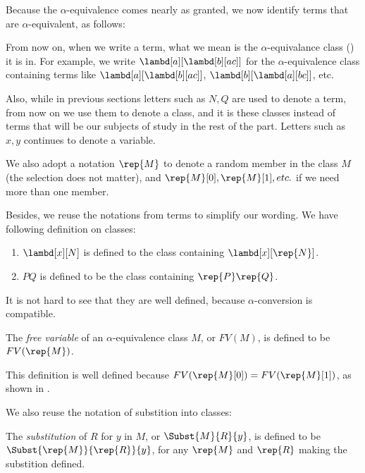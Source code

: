 \documentclass[../../../include/open-logic-section]{subfiles}
\begin{document}

Because the $\alpha$-equivalence comes nearly as granted, we now
identify terms that are $\alpha$-equivalent, as follows:

From now on, when we write a term, what we mean is the
$\alpha$-equivalance class () it is in. For
example, we write $\lambd[a][\lambd[b][a c]]$ for the
$\alpha$-equivalence class containing terms like
$\lambd[a][\lambd[b][a c]]$, $\lambd[b][\lambd[a][b c]]$, etc.

Also, while in previous sections letters such as $N, Q$ are used to
denote a term, from now on we use them to denote a class,
and it is these classes instead of terms that
will be our subjects of study in the rest of the part. Letters such as
$x, y$ continues to denote a variable.

We also adopt a notation $\rep{M}$ to denote a random member in the
class $M$ (the selection does not matter), and $\rep{M}[0], \rep{M}[1], etc. $ if we need more than
one member.

Besides, we reuse the notations from terms to simplify our wording. We
have following definition on classes:
\begin{defn}
  \begin{enumerate}
  \item $\lambd[x][N]$ is defined to the class containing
    $\lambd[x][\rep{N}]$.
  \item $PQ$ is defined to be the class containing $\rep{P}\rep{Q}$.
  \end{enumerate}
\end{defn}

It is not hard to see that they are well defined, because
$\alpha$-conversion is compatible.

\begin{defn} 
  The \emph{free variable} of an $\alpha$-equivalence class $M$, or $FV(M)$, is defined to be $FV(\rep{M})$.
\end{defn}

This definition is well defined because $FV(\rep{M}[0]) = FV(\rep{M}[1])$, as shown in .

We also reuse the notation of substition into classes:
\begin{defn} 
  The \emph{substitution} of $R$ for $y$ in $M$, or $\Subst{M}{R}{y}$, is
  defined to be $\Subst{\rep{M}}{\rep{R}}{y}$, for any $\rep{M}$ and
  $\rep{R}$ making the substition defined.
\end{defn}
\end{document}
